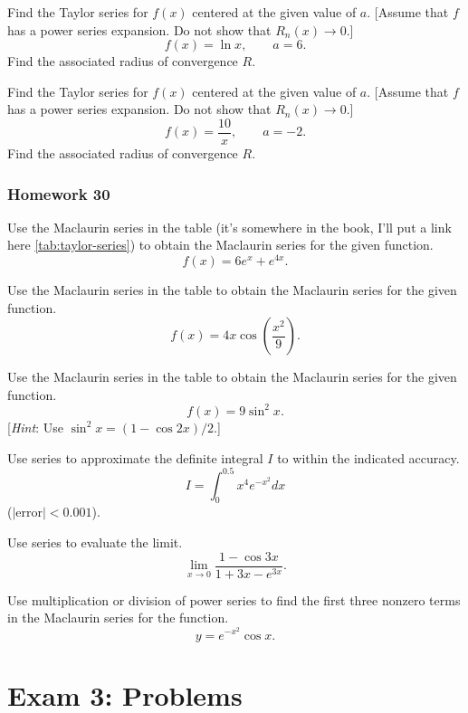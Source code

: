 \begin{problem}[WebAssign HW 29, \# 4]
Find the Taylor series for $f(x)$ centered at the given value of
$a$. [Assume that $f$ has a power series expansion. Do not show that
$R_n(x)\to 0$.]
\[
f(x)=\ln x,\qquad a=6.
\]
Find the associated radius of convergence $R$.
\end{problem}

\begin{problem}[WebAssign HW 29, \# 5]
Find the Taylor series for $f(x)$ centered at the given value of
$a$. [Assume that $f$ has a power series expansion. Do not show that
$R_n(x)\to 0$.]
\[
f(x)=\frac{10}{x},\qquad a=-2.
\]
Find the associated radius of convergence $R$.
\end{problem}

\subsection{Homework 30}
\begin{problem}[WebAssign HW 30, \# 1]
Use the Maclaurin series in the table (it's somewhere in the book, I'll put
a link here \ref{tab:taylor-series}) to obtain the Maclaurin series for the
given function.
\[
f(x)=6e^x+e^{4x}.
\]
\end{problem}

\begin{problem}[WebAssign HW 30, \# 2]
Use the Maclaurin series in the table to obtain the Maclaurin series for
the given function.
\[
f(x)=4x\cos\left(\frac{x^2}{9}\right).
\]
\end{problem}

\begin{problem}[WebAssign HW 30, \# 3]
Use the Maclaurin series in the table to obtain the Maclaurin series for
the given function.
\[
f(x)=9\sin^2 x.
\]
[\emph{Hint}: Use $\sin^2 x=(1-\cos 2x)/2$.]
\end{problem}

\begin{problem}[WebAssign HW 30, \# 4]
Use series to approximate the definite integral $I$ to within the indicated
accuracy.
\[
I=\int_0^{0.5} x^4 e^{-x^2}dx
\]
($|\mathrm{error}|<0.001$).
\end{problem}

\begin{problem}[WebAssign HW 30, \# 5]
Use series to evaluate the limit.
\[
\lim_{x\to 0}\frac{1-\cos 3x}{1+3x-e^{3x}}.
\]
\end{problem}

\begin{problem}[WebAssign HW 30, \# 6]
Use multiplication or division of power series to find the first three
nonzero terms in the Maclaurin series for the function.
\[
y=e^{-x^2}\cos x.
\]
\end{problem}
\newpage
\chapter{Exam 3: Problems}

